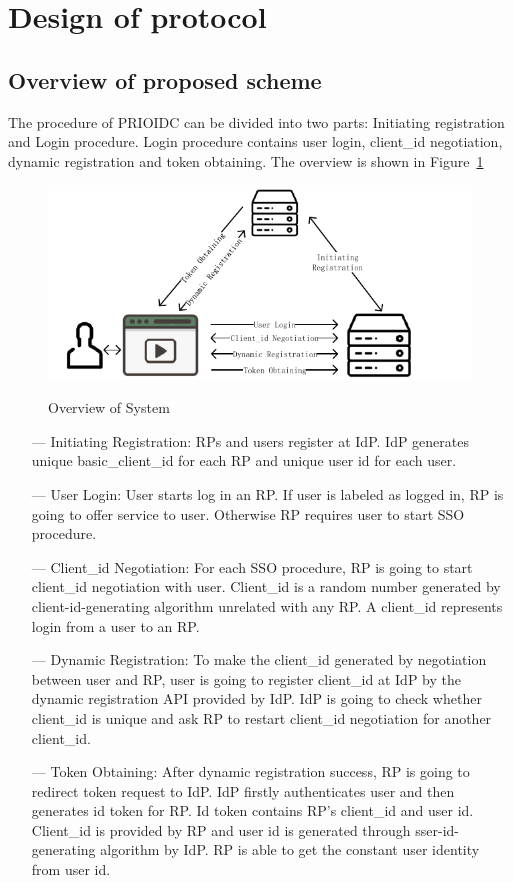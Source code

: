 \section{Design of protocol}
\label{sec:protocol}
\subsection{Overview of proposed scheme}
The procedure of PRIOIDC can be divided into two parts: Initiating registration and Login procedure. Login procedure contains user login, client\_id negotiation, dynamic registration and token obtaining. The overview is shown in Figure~\ref{fig:overview}
\begin{figure}
  \centering
  \includegraphics[width=\linewidth]{fig/prioidc.pdf}\label{fig:overview}
  \caption{Overview of System}
  \label{fig:overview}
\end{figure}
\begin{itemize}
\item[---] Initiating Registration: RPs and users register at IdP. IdP generates unique basic\_client\_id for each RP and unique user id for each user.
\item[---] User Login: User starts log in an RP. If user is labeled as logged in, RP is going to offer service to user. Otherwise RP requires user to start SSO procedure. 
\item[---] Client\_id Negotiation: For each SSO procedure, RP is going to start client\_id negotiation with user. Client\_id is a random number generated by client-id-generating algorithm unrelated with any RP. A client\_id represents login from a user to an RP.
\item[---] Dynamic Registration: To make the client\_id generated by negotiation between user and RP, user is going to register client\_id at IdP by the dynamic registration API provided by IdP. IdP is going to check whether client\_id is unique and ask RP to restart client\_id negotiation for another client\_id.
\item[---] Token Obtaining: After dynamic registration success, RP is going to redirect token request to IdP. IdP firstly authenticates user and then generates id token for RP. Id token contains RP's client\_id and user id. Client\_id is provided by RP and user id is generated through sser-id-generating algorithm by IdP. RP is able to get the constant user identity from user id.
\end{itemize}

